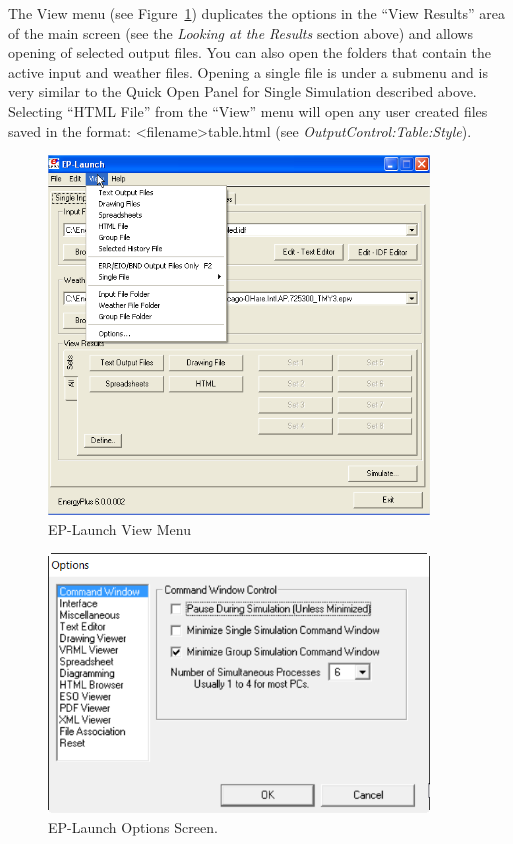 The View menu (see Figure~\ref{fig:ep-launch-view-menu}) duplicates the options in the ``View Results'' area of the main screen (see the \emph{Looking at the Results} section above) and allows opening of selected output files. You can also open the folders that contain the active input and weather files. Opening a single file is under a submenu and is very similar to the Quick Open Panel for Single Simulation described above. Selecting ``HTML File'' from the ``View'' menu will open any user created files saved in the format: \textless{}filename\textgreater{}table.html (see \emph{OutputControl:Table:Style}).

\begin{figure}[hbtp] %
\centering
\includegraphics[width=0.9\textwidth, height=0.9\textheight, keepaspectratio=true]{media/image105.png}
\caption{EP-Launch View Menu \protect \label{fig:ep-launch-view-menu}}
\end{figure}

\begin{figure}[hbtp] %
\centering
\includegraphics[width=0.9\textwidth, height=0.9\textheight, keepaspectratio=true]{media/image106.png}
\caption{EP-Launch Options Screen. \protect \label{fig:ep-launch-options-screen.}}
\end{figure}

